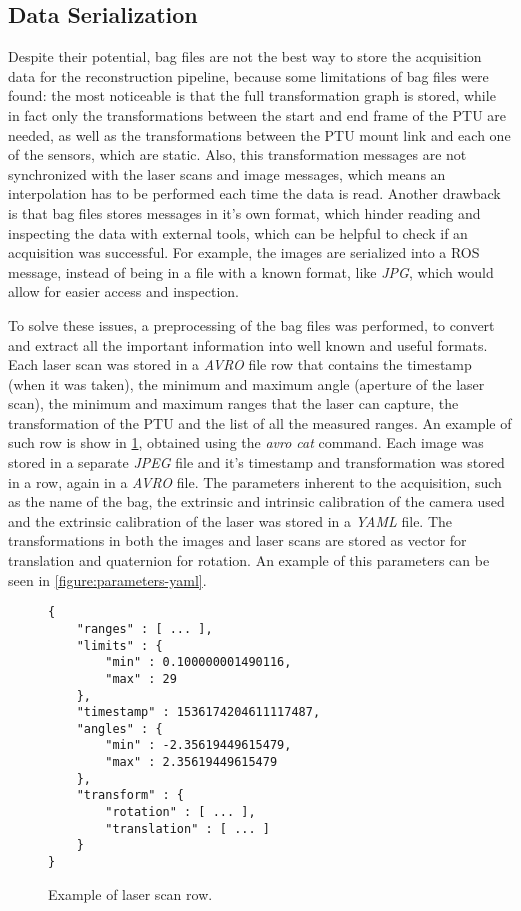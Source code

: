 \subsection{Data Serialization}
 
Despite their potential, bag files are not the best way to store the acquisition data for the reconstruction pipeline, because some limitations of bag files were found: the most noticeable is that the full transformation graph is stored, while in fact only the transformations between the start and end frame of the PTU are needed, as well as the transformations between the PTU mount link and each one of the sensors, which are static. Also, this transformation messages are not synchronized with the laser scans and image messages, which means an interpolation has to be performed each time the data is read. Another drawback is that bag files stores messages in it's own format, which hinder reading and inspecting the data with external tools, which can be helpful to check if an acquisition was successful. For example, the images are serialized into a ROS message, instead of being in a file with a known format, like \emph{JPG}, which would allow for easier access and inspection.

To solve these issues, a preprocessing of the bag files was performed, to convert and extract all the important information into well known and useful formats. Each laser scan was stored in a \emph{AVRO} file row that contains the timestamp (when it was taken), the minimum and maximum angle (aperture of the laser scan), the minimum and maximum ranges that the laser can capture, the transformation of the PTU and the list of all the measured ranges. An example of such row is show in \cref{figure:laserscan-row}, obtained using the \emph{avro cat} command. Each image was stored in a separate \emph{JPEG} file and it's timestamp and transformation was stored in a row, again in a \emph{AVRO} file. The parameters inherent to the acquisition, such as the name of the bag, the extrinsic and intrinsic calibration of the camera used and the extrinsic calibration of the laser was stored in a \emph{YAML} file. The transformations in both the images and laser scans are stored as vector for translation and quaternion for rotation. An example of this parameters can be seen in \cref{figure:parameters-yaml}.

\begin{figure}
    
    \begin{Verbatim}[frame=single, fontsize=\small]
{
    "ranges" : [ ... ],
    "limits" : {
        "min" : 0.100000001490116,
        "max" : 29
    },
    "timestamp" : 1536174204611117487,
    "angles" : {
        "min" : -2.35619449615479,
        "max" : 2.35619449615479
    },
    "transform" : {
        "rotation" : [ ... ],
        "translation" : [ ... ]
    }
}
    \end{Verbatim}

    \caption{Example of laser scan row.}
\label{figure:laserscan-row}
\end{figure}


